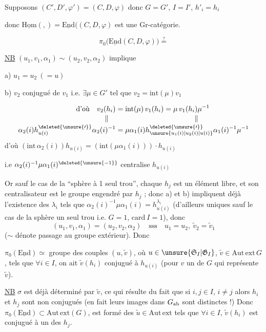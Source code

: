 Supposons $(C',D',\varphi')=(C,D,\varphi)$ donc $G=G'$, $I=I'$, $h'_i=h_i$

donc $\underline{\mathrm{Hom}}(,)=\underline{\mathrm{End}}((C,D,\varphi)$ est une Gr-catégorie.

\[
\pi_0\big(\underline{\mathrm{End}}(C,D,\varphi)\big)\overset{?}{=}
\]

\uline{NB} $(u_1,v_1,\alpha_1)\sim(u_2,v_2,\alpha_2)$  implique

a) $u_1=u_2\ (=u)$

b) $v_2$ conjugué de $v_1$ i.e. $\exists\mu\in G'$ tel que $v_2=\mathrm{int}(\mu)v_1$

\[
\begin{aligned}
\text{d'où}\quad v_2(h_i)&=\mathrm{int}(\mu)\,v_1(h_i)=\mu\,v_1(h_i)\mu^{-1}\\[-2pt]
\Vert\quad &\hspace{11em}\Vert\\[-2pt]
\alpha_2(i)h_{u(i)}^{\deleted{\unsure{\prime}}}\alpha_2(i)^{-1}
&=\mu\alpha_1(i)h_{\unsure{u_1(i)|u_2(i)|u(i)}}^{\deleted{\unsure{\prime}}}\alpha_1(i)^{-1}\mu^{-1}
\end{aligned}
\]
d'où \quad $(\mathrm{int}\,\alpha_2(i))h_{u(i)}=(\mathrm{int}(\mu\alpha_1(i)))\cdot h_{u(i)}$

i.e  $\alpha_2(i)^{-1}\mu\alpha_1(i)^{\deleted{\unsure{-1}}}$ centralise $h_{u(i)}$

Or sauf le cas de la ``sphère à 1 seul trou'', chaque $h_j$ est un élément libre, et  son centralisateur est le groupe engendré par $h_j$ ;  donc a) et b) impliquent déjà l'existence des $\lambda_i$ tels que $\alpha_2(i)^{-1}\mu\alpha_1(i)=h_{u(i)}^{\lambda_i}$ (d'ailleurs uniques sauf le cas de la sphère  un seul trou i.e. $G=1$, $\mathrm{card}\ I=1$), donc
\[
(u_1,v_1,\alpha_1)=(u_2,v_2,\alpha_2)\quad\text{sss}\quad u_1=u_2,\ \widetilde v_2=\widetilde v_1
\]
($\sim$ dénote passage au groupe extérieur). Donc

$\pi_0(\underline{\mathrm{End}})\simeq$ groupe des couples $(u,\widetilde v)$, où $u\in\unsure{\mathfrak S_I|\mathfrak G_I}$, $\widetilde v\in\mathrm{Aut\,ext}\,G$, tels que $\forall i\in I$, on ait $\widetilde v(h_i)$ conjugué à $h_{u(i)}$ (pour $v$ un  de $G$ qui représente $\widetilde v$).

\uline{NB} $\sigma$ est déjà déterminé par $\widetilde v$, ce qui résulte du fait que si $i,j\in I$, $i\ne j$ alors $h_i$ et $h_j$ sont non conjugués (en fait leurs images dans $G_{\rm ab}$ sont distinctes !) Donc $\pi_0(\underline{\mathrm{End}})\subset\mathrm{Aut\,ext}(G)$, est formé des $\widetilde u\in\mathrm{Aut\,ext}$ tels que $\forall i\in I$, $\widetilde v(h_i)$ est conjugué à un des $h_j$.
